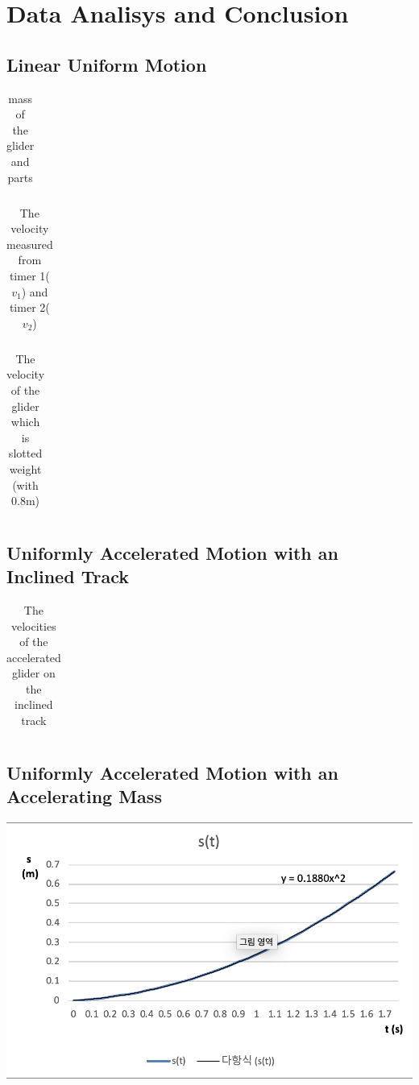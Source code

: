 \documentclass{article}
\begin{document}
\section{Data Analisys and Conclusion}

\subsection{Linear Uniform Motion}

\begin{table}[h!]
\centering
\begin{tabular}{}
\end{tabular}
\caption{mass of the glider and parts}
\label{table:1}
\end{table}

\begin{table}[h!]
\centering
\begin{tabular}{}
\end{tabular}	
\caption{The velocity measured from timer 1($v_1$) and timer 2($v_2$)}
\label{table:2}
\end{table}

\begin{table}[h!]
\centering
\begin{tabular}{}
\end{tabular}
\caption{The velocity of the glider which is slotted weight (with 0.8m)}
\label{table:3}
\end{table}

\subsection{Uniformly Accelerated Motion with an Inclined Track}


\begin{table}[h!]
\centering
\begin{tabular}{}	
\end{tabular}
\caption{The velocities of the accelerated glider on the inclined track}
\label{table:4}
\end{table}


\subsection{Uniformly Accelerated Motion with an Accelerating Mass}

\includegraphics[width=\columnwidth]{S.png}
\end{document}
